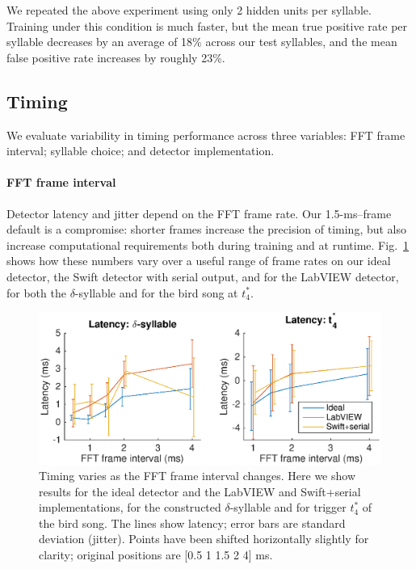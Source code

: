 \documentclass[10pt,letterpaper]{article}
\newcommand\fig[1]{Fig.~\ref{#1}}
\renewcommand{\subsubsection}[1]{\paragraph{#1}}
\begin{document}
We repeated the above experiment using only 2 hidden units per syllable.  Training under this condition is much faster, but the mean true positive rate per syllable decreases by an average of 18\% across our test syllables, and the mean false positive rate increases by roughly 23\%.

\subsection{Timing}

We evaluate variability in timing performance across three variables:
FFT frame interval; syllable choice; and detector implementation.

\subsubsection{FFT frame interval}

Detector latency and jitter depend on the FFT frame rate.  Our
1.5-ms--frame default is a compromise: shorter frames increase the
precision of timing, but also increase computational requirements both
during training and at runtime.  \fig{fig:TimingVsFrame} shows how
these numbers vary over a useful range of frame rates on our ideal
detector, the Swift detector with serial output, and for the LabVIEW
detector, for both the $\delta$-syllable and for the bird song at
$t^*_4$.

\begin{figure}
  \includegraphics[width=\textwidth]{Fig4}
  \caption{Timing varies as the FFT frame interval changes.  Here we
    show results for the ideal detector and the LabVIEW and
    Swift+serial implementations, for the constructed
    $\delta$-syllable and for trigger $t^*_4$ of the bird song.  The
    lines show latency; error bars are standard deviation (jitter).  Points have
    been shifted horizontally slightly for clarity; original positions are [0.5 1
      1.5 2 4] ms.}
  \label{fig:TimingVsFrame}
\end{figure}
\end{document}
